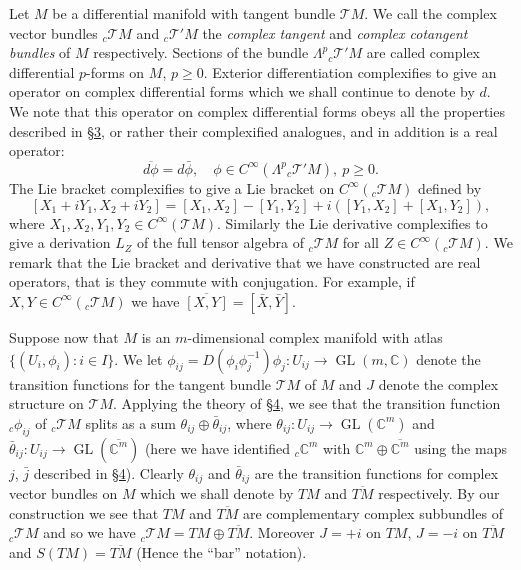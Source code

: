 Let $M$ be a differential manifold with tangent bundle $\mathcal TM$. We call the complex vector bundles ${}_c\mathcal TM$ and ${}_c\mathcal T'M$ the \emph{complex tangent} and \emph{complex cotangent bundles} of $M$ respectively. Sections of the bundle $\Lambda^p{}_c\mathcal T'M$ are called complex differential $p$-forms on $M$, $p\geq0$. Exterior differentiation complexifies to give an operator on complex differential forms which we shall continue to denote by $d$. We note that this operator on complex differential forms obeys all the properties described in \hyperref[sec:5:3]{\S3}, or rather their complexified analogues, and in addition is a real operator:
\[\overline{d\phi}=d\bar\phi,\quad\phi\in C^\infty(\Lambda^p{}_c\mathcal T'M),\ p\geq0.\]
The Lie bracket complexifies to give a Lie bracket on $C^\infty({}_c\mathcal TM)$ defined by
\[[X_1+iY_1,X_2+iY_2]=[X_1,X_2]-[Y_1,Y_2]+i([Y_1,X_2]+[X_1,Y_2]),\]
where $X_1,X_2,Y_1,Y_2\in C^\infty(\mathcal TM)$. Similarly the Lie derivative complexifies to give a derivation $L_Z$ of the full tensor algebra of ${}_c\mathcal TM$ for all $Z\in C^\infty({}_c\mathcal TM)$. We remark that the Lie bracket and derivative that we have constructed are real operators, that is they commute with conjugation. For example, if $X,Y\in C^\infty({}_c\mathcal TM)$ we have $\overline{[X,Y]}=[\bar X,\bar Y]$.

Suppose now that $M$ is an $m$-dimensional complex manifold with atlas $\{(U_i,\phi_i):i\in I\}$. We let $\phi_{ij}=D(\phi_i\phi_j^{-1})\phi_j:U_{ij}\to\operatorname{GL}(m,\mathbb C)$ denote the transition functions for the tangent bundle $\mathcal TM$ of $M$ and $J$ denote the complex structure on $\mathcal TM$. Applying the theory of \hyperref[sec:5:4]{\S4}, we see that the transition function ${}_c\phi_{ij}$ of ${}_c\mathcal TM$ splits as a sum $\theta_{ij}\oplus\bar\theta_{ij}$, where
$\theta_{ij}:U_{ij}\to\operatorname{GL}(\mathbb C^m)$ and $\bar\theta_{ij}:U_{ij}\to\operatorname{GL}(\overline{\mathbb C^m})$ (here we have identified ${}_c\mathbb C^m$ with $\mathbb C^m\oplus\overline{\mathbb C^m}$ using the maps $j$, $\bar j$ described in \hyperref[sec:5:4]{\S4}). Clearly $\theta_{ij}$ and $\bar\theta_{ij}$ are the transition functions for complex vector bundles on $M$ which we shall denote by $TM$ and $\overline{TM}$ respectively. By our construction we see that $TM$ and $\overline{TM}$ are complementary complex subbundles of ${}_c\mathcal TM$ and so we have ${}_c\mathcal TM=TM\oplus\overline{TM}$. Moreover $J=+i$ on $TM$, $J=-i$ on $\overline{TM}$ and $S(TM)=\overline{TM}$ (Hence the ``bar'' notation).

